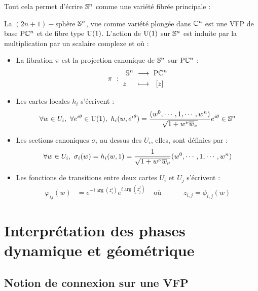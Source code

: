 Tout cela permet d'écrire $\S{n}$ comme une variété fibrée principale :
\begin{proposition}
	La $(2n+1)-$sphère $\S{n}$, vue comme variété plongée dans $\C^n$ est une VFP de base $\PC{n}$ et de fibre type $\U{1}$. L'action de $\U{1}$ sur $\S{n}$ est induite par la multiplication par un scalaire complexe et où :
	\begin{itemize}
		\item La fibration $\pi$ est la projection canonique de $\S{n}$ sur $\PC{n}$ :
		\begin{equation}
			\pi\ :\ \begin{aligned} \S{n}\ &\lr\ \PC{n} \\ z\quad\ &\lmt\ \ [z]\end{aligned}
		\end{equation}
		
		\item Les cartes locales $h_i$ s'écrivent :
		\begin{equation}
			\forall w \in U_i,\ \forall e^{i\theta}\in\U{1},\  h_i(w,e^{i\theta}) = \frac{(w^0,\cdots, 1,\cdots, w^n)}{\sqrt{1 + w^\nu \congu{w}_\nu}}e^{i\theta} \in \S{n}
		\end{equation}
		
		\item Les sections canoniques $\sigma_i$ au dessus des $U_i$, elles,  sont définies par :
		\begin{equation}
			\forall w \in U_i,\ \sigma_i(w) = h_i(w, 1) = \frac{1}{\sqrt{1 + w^\nu \congu{w}_\nu}}(w^0,\cdots, 1,\cdots, w^n)
		\end{equation}
		
		\item Les fonctions de transitions entre deux cartes $U_i$ et $U_j$ s'écrivent :
		\begin{align}
			\varphi_{ij}(w) &= e^{-i \arg (z_i^i)} e^{i \arg (z_j^j)}  &  \text{ où }&\qquad z_{i,j} = \phi_{i,j}(w)
		\end{align}
	\end{itemize}
\end{proposition}
\skipl




\section{Interprétation des phases dynamique et géométrique}

\subsection{Notion de connexion sur une VFP}
\label{subsec:connexion2VFP}

